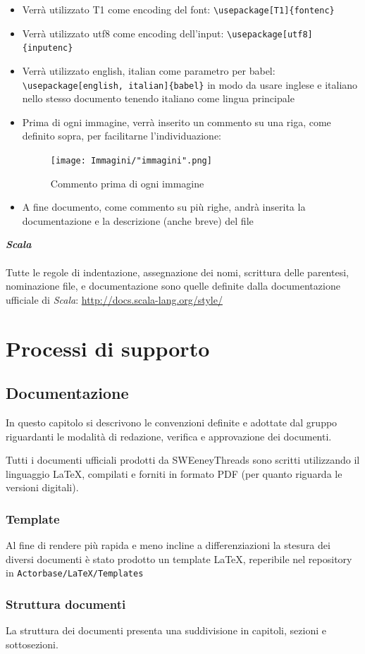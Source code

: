 \documentclass[a4paper]{report}
\newcommand{\mychapter}[2]{
	\setcounter{chapter}{#1}
	\setcounter{section}{0}
	\setcounter{subsection}{1}
	\chapter*{#2}
	\addcontentsline{toc}{chapter}{#2}
}
\begin{document}
\begin{itemize}
\begin{figure}[h!]
		\end{figure}
		\item Verrà utilizzato T1 come encoding del font: \verb|\usepackage[T1]{fontenc}|
		\item Verrà utilizzato utf8 come encoding dell'input: \verb|\usepackage[utf8]{inputenc}|
		\item Verrà utilizzato english, italian come parametro per babel: \verb|\usepackage[english, italian]{babel}| in modo da 
		usare inglese e italiano nello stesso documento tenendo italiano come lingua principale
		\item Prima di ogni immagine, verrà inserito un commento su una riga, come definito sopra, per facilitarne l'individuazione:
		\begin{figure}[h!]
			\centering
			\texttt{[image: Immagini/"immagini".png]}
			\caption{Commento prima di ogni immagine}
		\end{figure}
		\item A fine documento, come commento su più righe, andrà inserita la documentazione e la descrizione (anche breve) del file
	\end{itemize}
	\textbf{\emph{Scala}} \\ \\ 
	Tutte le regole di indentazione, assegnazione dei nomi, scrittura delle parentesi, nominazione file, e documentazione sono quelle
	definite dalla documentazione ufficiale di \emph{Scala}: \url{http://docs.scala-lang.org/style/}
	\mychapter{3}{Processi di supporto}
	\section{Documentazione} %
	In questo capitolo si descrivono le convenzioni definite e adottate dal gruppo riguardanti le 
	modalità di redazione, verifica e approvazione dei documenti.
	
	Tutti i documenti ufficiali prodotti da SWEeneyThreads sono scritti utilizzando il linguaggio \LaTeX, compilati e
	forniti in formato PDF (per quanto riguarda le versioni digitali).
	\subsection{Template}
	Al fine di rendere più rapida e meno incline a differenziazioni la stesura dei diversi documenti è stato prodotto un
	template \LaTeX, reperibile nel repository in \verb|Actorbase/LaTeX/Templates| %
	\subsection{Struttura documenti}
	La struttura dei documenti presenta una suddivisione in capitoli, sezioni e sottosezioni. 
	
\end{document}
